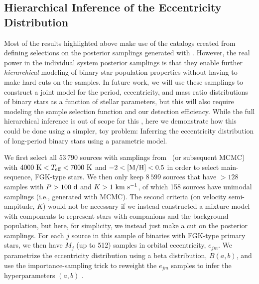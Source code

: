 \documentclass[modern]{aastex63}
\begin{document}
\subsection{Hierarchical Inference of the Eccentricity Distribution}
\label{sec:hierarch-ecc}

Most of the results highlighted above make use of the catalogs created from
defining selections on the posterior samplings generated with \thejoker.
However, the real power in the individual system posterior samplings is that
they enable further \emph{hierarchical} modeling of binary-star population
properties without having to make hard cuts on the samples.
In future work, we will use these samplings to construct a joint model for the
period, eccentricity, and mass ratio distributions of binary stars as a function
of stellar parameters, but this will also require modeling the sample selection
function and our detection efficiency.
While the full hierarchical inference is out of scope for this \documentname,
here we demonstrate how this could be done using a simpler, toy problem:
Inferring the eccentricity distribution of long-period binary stars using a
parametric model.

We first select all $53\,790$ sources with samplings from \thejoker\ (or
subsequent MCMC) with $4000~\textrm{K} < T_{\textrm{eff}} < 7000~\textrm{K}$ and $-2 < {[{\rm M}/{\rm H}]}
< 0.5$ in order to select main-sequence, FGK-type stars.
We then only keep $8\,599$ sources that have $>128$ samples with $P > 100~\mathrm{d}$
and $K > 1~\mathrm{km}~\mathrm{s}^{-1}$, of which 158 sources have unimodal samplings (i.e., generated
with MCMC).
The second criteria (on velocity semi-ampitude, $K$) would not be necessary if
we instead constructed a mixture model with components to represent stars with
companions and the background population, but here, for simplicity, we instead
just make a cut on the posterior samplings.
For each $j$ source in this sample of binaries with FGK-type primary stars, we
then have $M_j$ (up to 512) samples in orbital eccentricity, $e_{jm}$.
We parametrize the eccentricity distribution using a beta distribution,
$B(a,b)$, and use the importance-sampling trick to reweight the $e_{jm}$ samples
to infer the hyperparameters $(a, b)$ \citep{Hogg:2010}.
\end{document}
